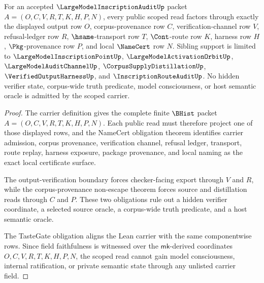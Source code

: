 \begin{theorem}
\label{thm:large-model-inscription-audit-scoped-carrier-coverage}
For an accepted $\LargeModelInscriptionAuditUp$ packet $A=(O,C,V,R,T,K,H,P,N)$, every public scoped read factors through exactly the displayed output row $O$, corpus-provenance row $C$, verification-channel row $V$, refusal-ledger row $R$, $\hsame$-transport row $T$, $\Cont$-route row $K$, harness row $H$, $\Pkg$-provenance row $P$, and local $\NameCert$ row $N$. Sibling support is limited to $\LargeModelInscriptionPointUp$, $\LargeModelActivationOrbitUp$, $\LargeModelAuditChannelUp$, $\CorpusSupplyDistillationUp$, $\VerifiedOutputHarnessUp$, and $\InscriptionRouteAuditUp$. No hidden verifier state, corpus-wide truth predicate, model consciousness, or host semantic oracle is admitted by the scoped carrier.
\end{theorem}
\begin{proof}
The carrier definition gives the complete finite $\BHist$ packet $A=(O,C,V,R,T,K,H,P,N)$. Each public read must therefore project one of those displayed rows, and the NameCert obligation theorem identifies carrier admission, corpus provenance, verification channel, refusal ledger, transport, route replay, harness exposure, package provenance, and local naming as the exact local certificate surface.

The output-verification boundary forces checker-facing export through $V$ and $R$, while the corpus-provenance non-escape theorem forces source and distillation reads through $C$ and $P$. These two obligations rule out a hidden verifier coordinate, a selected source oracle, a corpus-wide truth predicate, and a host semantic oracle.

The TasteGate obligation aligns the Lean carrier with the same componentwise rows. Since field faithfulness is witnessed over the $\mathsf{mk}$-derived coordinates $O,C,V,R,T,K,H,P,N$, the scoped read cannot gain model consciousness, internal ratification, or private semantic state through any unlisted carrier field.
\end{proof}



